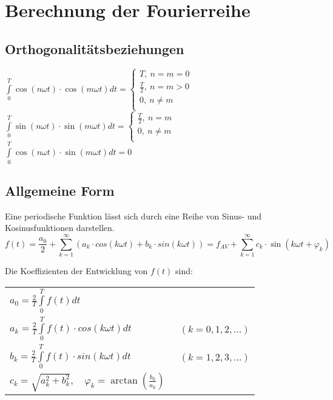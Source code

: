 \section{Berechnung der Fourierreihe}
\subsection{Orthogonalitätsbeziehungen}

            $\int\limits_0^T \cos(n\omega t)\cdot \cos(m\omega t)dt=
            \begin{cases}
            T,\ n=m=0\\
            \frac{T}{2},\ n=m>0\\ 
            0,\ n\neq m\\
            \end{cases}$\\
            
            
           $\int\limits_0^T \sin(n\omega t)\cdot \sin(m\omega t)dt=
           \begin{cases}
           \frac{T}{2},\ n=m\\
           0,\ n\neq m\\
           \end{cases}$\\
           $\int\limits_0^T \cos(n\omega t)\cdot \sin(m\omega t)dt=0$
           
\subsection{Allgemeine Form}
Eine periodische Funktion lässt sich durch eine Reihe von Sinus- und Kosinusfunktionen darstellen.
$$f(t) = \frac{a_{0}}{2}+\sum_{k = 1}^{\infty} (a_{k} \cdot cos(k \omega t)+ b_{k} \cdot sin(k \omega t)) = f_{AV} + \sum_{k = 1}^{\infty} c_k \cdot \sin(k\omega t + \varphi_k)$$

Die Koeffizienten der Entwicklung von $f(t)$ sind:\\
\begin{tabular}{ll}
  $a_{0} = \frac{2}{T}\int\limits_{0}^{T}f(t)dt$ & \\
  $a_{k} = \frac{2}{T}\int\limits_{0}^{T}f(t) \cdot cos(k \omega t)dt$   &\ $(k = 0,1,2,...)$\\
  $b_{k} = \frac{2}{T}\int\limits_{0}^{T}f(t) \cdot sin(k \omega t)dt$   &\ $(k = 1,2,3,...)$\\
  $c_{k} = \sqrt{a_k^2 + b_k^2},\quad \varphi_k = \arctan(\frac{b_k}{a_k})$
\end{tabular}
